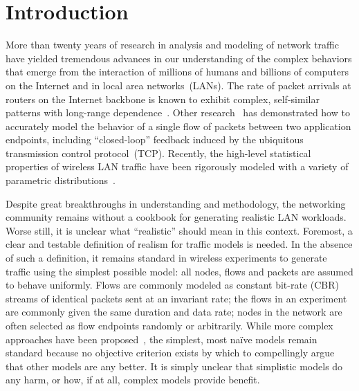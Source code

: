 \documentclass[conference]{IEEEtran}
\title{\thetitle}
\author{
{\large{Stefan~Karpinski, Elizabeth~M.~Belding, Kevin~C.~Almeroth}}\\
\textit{\{sgk,ebelding,almeroth\}@cs.ucsb.edu}\vspace{0.5em}\\
Department of Computer Science\\
University of California, Santa Barbara
\vspace{-0.5em}
}
\newcommand{\caps}[1]{{\small{#1}}}
\begin{document}
\maketitle

\begin{abstract}

\end{abstract}

\section{Introduction}\label{sec:intro}

More than twenty years of research in analysis and modeling of network traffic have yielded tremendous advances in our understanding of the complex behaviors that emerge from the interaction of millions of humans and billions of computers on the Internet and in local area networks~(\caps{LAN}s). The rate of packet arrivals at routers on the Internet backbone is known to exhibit complex, self-similar patterns with long-range dependence~\cite{Paxson95,Paxson96,Willinger98}. Other research~\cite{Hernandez06:dissertation} has demonstrated how to accurately model the behavior of a single flow of packets between two application endpoints, including ``closed-loop'' feedback induced by the ubiquitous transmission control protocol~(\caps{TCP}). Recently, the high-level statistical properties of wireless \caps{LAN} traffic have been rigorously modeled with a variety of parametric distributions~\cite{Hernandez06:wlan-traffic}.

Despite great breakthroughs in understanding and methodology, the networking community remains without a cookbook for generating realistic \caps{LAN} workloads. Worse still, it is unclear what ``realistic'' should mean in this context. Foremost, a clear and testable definition of realism for traffic models is needed. In the absence of such a definition, it remains standard in wireless experiments to generate traffic using the simplest possible model: all nodes, flows and packets are assumed to behave uniformly. Flows are commonly modeled as constant bit-rate (\caps{CBR}) streams of identical packets sent at an invariant rate; the flows in an experiment are commonly given the same duration and data rate; nodes in the network are often selected as flow endpoints randomly or arbitrarily. While more complex approaches have been proposed~\cite{Sommers04,Avallone04,Avallone06}, %
the simplest, most na\"ive models remain standard because no objective criterion exists by which to compellingly argue that other models are any better. It is simply unclear that simplistic models do any harm, or how, if at all, complex models provide benefit.
\end{document}
